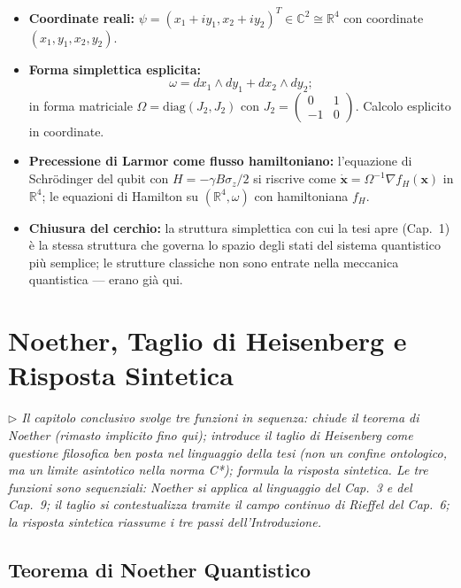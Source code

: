 \documentclass[12pt, a4paper]{article}
\newcommand{\nota}[1]{%
	\par\smallskip
	\noindent\textit{\small $\triangleright$\; #1}
	\par\smallskip
}
\begin{document}
	\begin{itemize}
		\item \textbf{Coordinate reali:} $\psi = (x_1 + iy_1, x_2 + iy_2)^T \in \mathbb{C}^2
		\cong \mathbb{R}^4$ con coordinate $(x_1, y_1, x_2, y_2)$.
		\item \textbf{Forma simplettica esplicita:}
		\[
		\omega = dx_1 \wedge dy_1 + dx_2 \wedge dy_2;
		\]
		in forma matriciale $\Omega = \mathrm{diag}(J_2, J_2)$ con $J_2 = \begin{pmatrix}
			0 & 1 \\ -1 & 0\end{pmatrix}$. Calcolo esplicito in coordinate.
		\item \textbf{Precessione di Larmor come flusso hamiltoniano:} l'equazione di
		Schrödinger del qubit con $H = -\gamma B\sigma_z/2$ si riscrive come
		$\dot{\mathbf{x}} = \Omega^{-1}\nabla f_H(\mathbf{x})$ in $\mathbb{R}^4$;
		le equazioni di Hamilton su $(\mathbb{R}^4, \omega)$ con hamiltoniana $f_H$.
		\item \textbf{Chiusura del cerchio:} la struttura simplettica con cui la tesi
		apre (Cap.\ 1) è la stessa struttura che governa lo spazio degli stati del
		sistema quantistico più semplice; le strutture classiche non sono entrate
		nella meccanica quantistica --- erano già qui.
	\end{itemize}
	
	\newpage
	\section{Noether, Taglio di Heisenberg e Risposta Sintetica}
	
	\nota{Il capitolo conclusivo svolge tre funzioni in sequenza: chiude il teorema di Noether
		(rimasto implicito fino qui); introduce il taglio di Heisenberg come questione filosofica
		ben posta nel linguaggio della tesi (non un confine ontologico, ma un limite asintotico
		nella norma C*); formula la risposta sintetica. Le tre funzioni sono sequenziali:
		Noether si applica al linguaggio del Cap.\ 3 e del Cap.\ 9; il taglio si contestualizza
		tramite il campo continuo di Rieffel del Cap.\ 6; la risposta sintetica riassume i tre
		passi dell'Introduzione.}
	
	\subsection{Teorema di Noether Quantistico}
	
\end{document}
